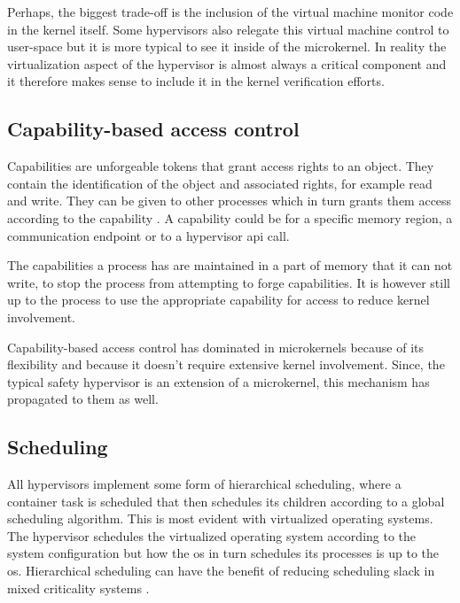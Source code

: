 Perhaps, the biggest trade-off is the inclusion of the virtual machine monitor code in the kernel itself. Some hypervisors also relegate this virtual machine control to user-space but it is more typical to see it inside of the microkernel. In reality the virtualization aspect of the hypervisor is almost always a critical component and it therefore makes sense to include it in the kernel verification efforts. 

\subsection{Capability-based access control} \label{sec:capability-based_ac}
Capabilities are unforgeable tokens that grant access rights to an object. They contain the identification of the object and associated rights, for example read and write.
They can be given to other processes which in turn grants them access according to the capability \cite{Levy.1984}. A capability could be for a specific memory region, a communication endpoint or to a hypervisor \acrshort{api} call.

The capabilities a process has are maintained in a part of memory that it can not write, to stop the process from attempting to forge capabilities. It is however still up to the process to use the appropriate capability for access to reduce kernel involvement.

Capability-based access control has dominated in microkernels because of its flexibility and because it doesn't require extensive kernel involvement. Since, the typical safety hypervisor is an extension of a microkernel, this mechanism has propagated to them as well.

\subsection{Scheduling} \label{hv-scheduling}
All hypervisors implement some form of hierarchical scheduling, where a container task is scheduled that then schedules its children according to a global scheduling algorithm. This is most evident with virtualized operating systems. The hypervisor schedules the virtualized operating system according to the system configuration but how the \acrshort{os} in turn schedules its processes is up to the \acrshort{os}. Hierarchical scheduling can have the benefit of reducing scheduling slack in mixed criticality systems \cite{MalcolmS.Mollison.2010}. 

